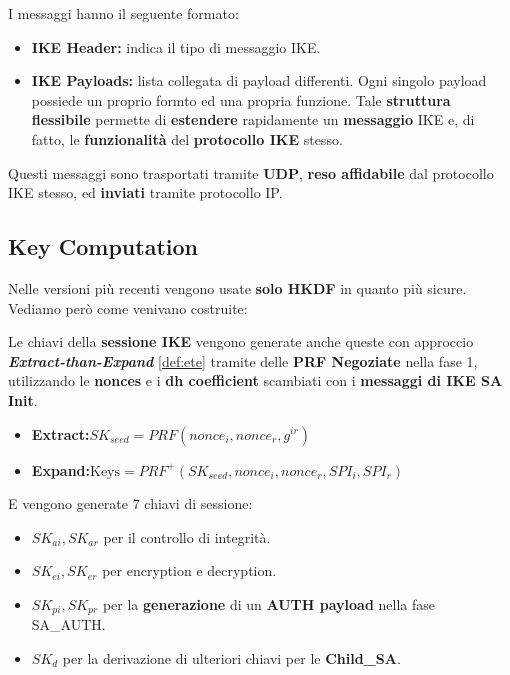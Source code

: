 \pagebreak
I messaggi hanno il seguente formato:
\begin{definition}\label{def:ikemsg}
\begin{itemize}
    \item \textbf{IKE Header:} indica il tipo di messaggio IKE.
    \item \textbf{IKE Payloads:} lista collegata di payload differenti. Ogni singolo payload possiede un proprio formto ed una propria funzione. Tale \textbf{struttura flessibile} permette di \textbf{estendere} rapidamente un \textbf{messaggio} IKE e, di fatto, le \textbf{funzionalità} del \textbf{protocollo IKE} stesso.
\end{itemize}
\begin{remark}
Questi messaggi sono trasportati tramite \textbf{UDP}, \textbf{reso affidabile} dal protocollo IKE stesso, ed \textbf{inviati} tramite protocollo IP.
\end{remark}
\end{definition}
\subsection{Key Computation}
\begin{note}
Nelle versioni più recenti vengono usate \textbf{solo HKDF} in quanto più sicure. Vediamo però come venivano costruite:
\end{note}
Le chiavi della \textbf{sessione IKE} vengono generate anche queste con approccio \textit{\textbf{Extract-than-Expand}} \cref{def:ete} tramite delle \textbf{PRF Negoziate} nella fase 1, utilizzando le \textbf{nonces} e i \textbf{dh coefficient} scambiati con i \textbf{messaggi di IKE SA Init}. 
\begin{definition}
\begin{itemize}
    \item \textbf{Extract:}$SK_{seed}=PRF(nonce_i,nonce_r,g^{ir})$\footnotemark
    \item \textbf{Expand:}$\text{Keys}=PRF^+(SK_{seed},nonce_i,nonce_r,SPI_i,SPI_r)$
\end{itemize}
E vengono generate 7 chiavi di sessione:
\begin{itemize}
    \item $SK_{ai},SK_{ar}$ per il controllo di integrità.
    \item $SK_{ei},SK_{er}$ per encryption e decryption.
    \item $SK_{pi},SK_{pr}$ per la \textbf{generazione} di un \textbf{AUTH payload} nella fase SA\_AUTH.
    \item $SK_{d}$ per la derivazione di ulteriori chiavi per le \textbf{Child\_SA}.
\end{itemize}
\end{definition}
